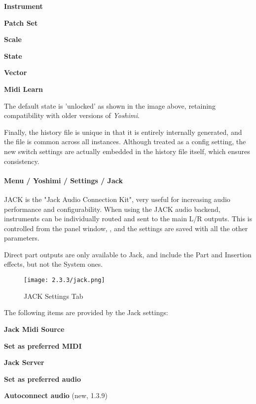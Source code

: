    \begin{enumber}
      \item \textbf{Instrument}
      \item \textbf{Patch Set}
      \item \textbf{Scale}
      \item \textbf{State}
      \item \textbf{Vector}
      \item \textbf{Midi Learn}
   \end{enumber}

   The default state is 'unlocked' as shown in the image above, retaining
   compatibility with older versions of \textsl{Yoshimi}.

   Finally, the history file is unique in that it is entirely internally
   generated, and the file is common across all instances. Although treated as
   a config setting, the new switch settings are actually embedded in the
   history file itself, which ensures consistency.


\paragraph{Menu / Yoshimi / Settings / Jack}
\label{paragraph:menu_yoshimi_settings_jack}

   JACK is the "Jack Audio Connection Kit", very useful for increasing audio
   performance and configurability.
   When using the JACK audio backend, instruments can be individually routed
   and sent to the main L/R outputs. This is controlled from the
   panel window,
   ,
   and the settings are saved with all the other parameters.

   Direct part outputs are only available to Jack, and include the Part and
   Insertion effects, but not the System ones.

\begin{figure}[H]
   \centering
   \texttt{[image: 2.3.3/jack.png]}
   \caption[JACK Settings]{JACK Settings Tab}
   \label{fig:yoshimi_settings_jack_tab}
\end{figure}

   The following items are provided by the Jack settings:

   \begin{enumber}
      \item \textbf{Jack Midi Source}
      \item \textbf{Set as preferred MIDI}
      \item \textbf{Jack Server}
      \item \textbf{Set as preferred audio}
      \item \textbf{Autoconnect audio} (new, 1.3.9)
   \end{enumber}

